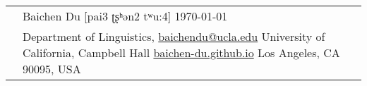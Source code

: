 \documentclass[letterpaper, 11pt]{article}
\newcommand{\headingfont}{\Large\color{MidnightBlue}}%
\newenvironment{SectionTable}[1]{
	\renewcommand*{\arraystretch}{1.5}
	\setlength{\tabcolsep}{10pt}
	\begin{longtable}{Rp{6.3in}} & #1 \vspace{0.13cm}\hrule\\}
{\end{longtable}\vspace{-1cm}}
\newenvironment{TitleTable}[1]{
	\renewcommand*{\arraystretch}{1.6}
	\setlength{\tabcolsep}{10pt}
	\begin{longtable}{Rp{6.3in}} & #1\\}
{\end{longtable}\vspace{-1cm}}
\begin{document}

\begin{TitleTable}
	{\huge{{Baichen Du}} \hspace{1cm}\Large{[pai3 ʈʂʰən2 tʷu:4]} \hfill{\small{\today}}} &
Department of Linguistics, \hfill \href{mailto::baichendu@ucla.edu}{baichendu@ucla.edu}\newline
University of California, Campbell Hall \hfill \href{https://baichen-du.github.io}{baichen-du.github.io}\newline
Los Angeles, CA 90095, USA\\
\end{TitleTable}



\end{document}
